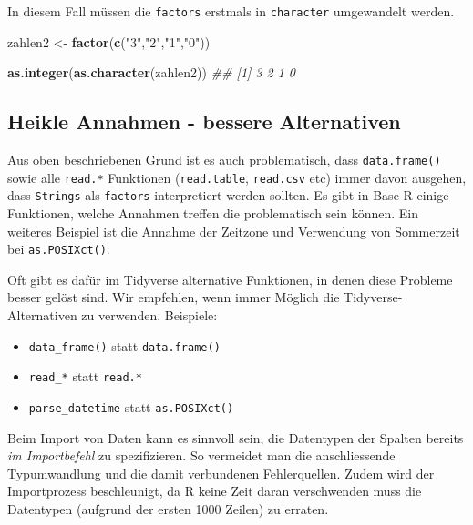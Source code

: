 \documentclass[]{book}
\newenvironment{Shaded}{\begin{snugshade}}{\end{snugshade}}
\newcommand{\CommentTok}[1]{\textcolor[rgb]{0.56,0.35,0.01}{\textit{#1}}}
\newcommand{\KeywordTok}[1]{\textcolor[rgb]{0.13,0.29,0.53}{\textbf{#1}}}
\newcommand{\NormalTok}[1]{#1}
\newcommand{\StringTok}[1]{\textcolor[rgb]{0.31,0.60,0.02}{#1}}
\providecommand{\tightlist}{%
  \setlength{\itemsep}{0pt}\setlength{\parskip}{0pt}}
\begin{document}
In diesem Fall müssen die \texttt{factors} erstmals in \texttt{character} umgewandelt werden.

\begin{Shaded}
\begin{Highlighting}[]
\NormalTok{zahlen2 <-}\StringTok{ }\KeywordTok{factor}\NormalTok{(}\KeywordTok{c}\NormalTok{(}\StringTok{"3"}\NormalTok{,}\StringTok{"2"}\NormalTok{,}\StringTok{"1"}\NormalTok{,}\StringTok{"0"}\NormalTok{))}

\KeywordTok{as.integer}\NormalTok{(}\KeywordTok{as.character}\NormalTok{(zahlen2))}
\CommentTok{## [1] 3 2 1 0}
\end{Highlighting}
\end{Shaded}

\hypertarget{heikle-annahmen---bessere-alternativen}{%
\subsection{Heikle Annahmen - bessere Alternativen}\label{heikle-annahmen---bessere-alternativen}}

Aus oben beschriebenen Grund ist es auch problematisch, dass \texttt{data.frame()} sowie alle \texttt{read.*} Funktionen (\texttt{read.table}, \texttt{read.csv} etc) immer davon ausgehen, dass \texttt{Strings} als \texttt{factors} interpretiert werden sollten. Es gibt in Base R einige Funktionen, welche Annahmen treffen die problematisch sein können. Ein weiteres Beispiel ist die Annahme der Zeitzone und Verwendung von Sommerzeit bei \texttt{as.POSIXct()}.

Oft gibt es dafür im Tidyverse alternative Funktionen, in denen diese Probleme besser gelöst sind. Wir empfehlen, wenn immer Möglich die Tidyverse-Alternativen zu verwenden. Beispiele:

\begin{itemize}
\tightlist
\item
  \texttt{data\_frame()} statt \texttt{data.frame()}
\item
  \texttt{read\_*} statt \texttt{read.*}
\item
  \texttt{parse\_datetime} statt \texttt{as.POSIXct()}
\end{itemize}

Beim Import von Daten kann es sinnvoll sein, die Datentypen der Spalten bereits \emph{im Importbefehl} zu spezifizieren. So vermeidet man die anschliessende Typumwandlung und die damit verbundenen Fehlerquellen. Zudem wird der Importprozess beschleunigt, da R keine Zeit daran verschwenden muss die Datentypen (aufgrund der ersten 1000 Zeilen) zu erraten.
\end{document}
